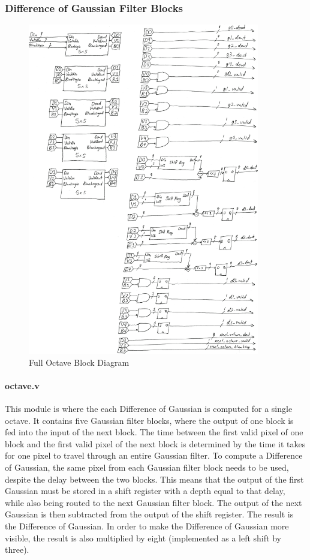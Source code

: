 \subsubsection{Difference of Gaussian Filter Blocks}

\begin{figure}
    \centering
    \includegraphics[width=0.9\textwidth]{processed_image_pngs/octave.png}
    \caption{Full Octave Block Diagram}
    \label{fig:octave}
\end{figure}

\paragraph{octave.v}

This module is where the each Difference of Gaussian is computed for a single octave. It contains five Gaussian filter blocks, where the output of one block is fed into the input of the next block. The time between the first valid pixel of one block and the first valid pixel of the next block is determined by the time it takes for one pixel to travel through an entire Gaussian filter. To compute a Difference of Gaussian, the same pixel from each Gaussian filter block needs to be used, despite the delay between the two blocks. This means that the output of the first Gaussian must be stored in a shift register with a depth equal to that delay, while also being routed to the next Gaussian filter block. The output of the next Gaussian is then subtracted from the output of the shift register. The result is the Difference of Gaussian. In order to make the Difference of Gaussian more visible, the result is also multiplied by eight (implemented as a left shift by three).

